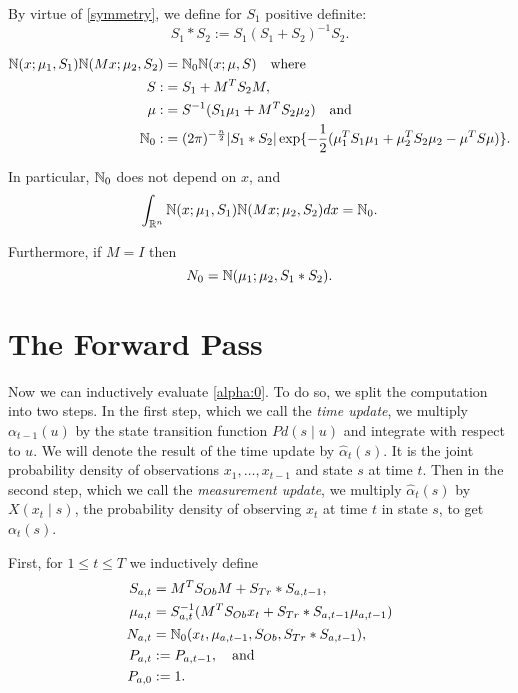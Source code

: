 \documentclass[12pt,leqno]{article}
\begin{document}
By virtue of \eqref{symmetry}, we define for $S_1$ positive definite:
$$
S_1*S_2 := S_1(S_1+S_2)^{-1}S_2.
$$

\begin{Cor}\label{comp_sq:2}
\begin{align*}
  {\mathbb N}(x;\mu_1,S_1){\mathbb N}(Mx;\mu_2,S_2) &= {\mathbb N}_0{\mathbb N}(x;\mu,S)\quad\text{where}\\
  S :&= S_1+M^TS_2M,\\
  \mu :&= S^{-1}(S_1\mu_1 + M^TS_2\mu_2)\quad\text{and} \\
  {\mathbb N}_0 :&= (2\pi)^{-\frac{n}{2}}|S_1*S_2|\exp\{-\frac{1}{2}(\mu_1^TS_1\mu_1 + \mu_2^TS_2\mu_2-\mu^TS\mu)\}.
\end{align*}

In particular, ${\mathbb N}_0$ does not depend on $x$, and
\begin{equation}\label{comp_sq:int}
  \int_{{\mathbb R}^{n}}  {\mathbb N}(x;\mu_1,S_1){\mathbb N}(Mx;\mu_2,S_2)dx = {\mathbb N}_0.
\end{equation}

Furthermore, if $M = I$ then 
\begin{equation}\label{exact_prod} 
  N_0 = {\mathbb N}(\mu_1;\mu_2,S_1*S_2).
\end{equation}
\end{Cor}

\section{The Forward Pass}
  Now we can inductively evaluate \eqref{alpha:0}. To do so, we split the computation
  into two steps.  In the first step, which we call the {\em time update}, we multiply
  $\alpha_{t-1}(u)$ by the state transition function $Pd(s\mid u)$ and integrate with respect
  to $u$. We will denote the result of the time update by $\hat{\alpha}_t(s)$.  It is the joint probability
  density of observations $x_1,\dots,x_{t-1}$ and state $s$ at time $t$.
  Then in the second step, which we call the {\em measurement update}, we multiply
  $\hat{\alpha}_t(s)$ by $X(x_t \mid s)$, the probability density of observing $x_t$ at time $t$
  in state $s$, to get $\alpha_t(s)$.

  First, for $1\le t \le T$ we inductively define
\begin{align*}
  S_{a,t} &= M^TS_{Ob}M + S_{Tr}*S_{a,t-1},\\
  \mu_{a,t} &= S_{a,t}^{-1}(M^TS_{Ob}x_t + S_{Tr}*S_{a,t-1}\mu_{a,t-1})\\
  N_{a,t} &= {\mathbb N}_0(x_t,\mu_{a,t-1},S_{Ob},S_{Tr}*S_{a,t-1}),\\
  P_{a,t} &:= P_{a,t-1},\quad\text{and}\\
  P_{a,0} &:= 1.
\end{align*}
\end{document}
